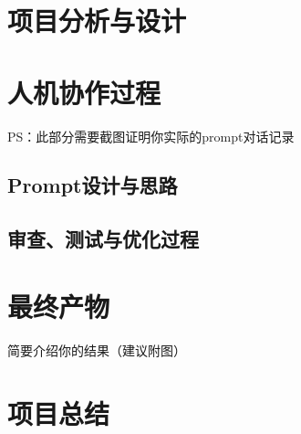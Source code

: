 \documentclass{sysucseexp}
\begin{document}

\makecover
\tableofcontents
\cleardoublepage
\pagestyle{main} %

\section{项目分析与设计}


\section{人机协作过程}
PS：此部分需要截图证明你实际的prompt对话记录
\subsection{Prompt设计与思路}
\subsection{审查、测试与优化过程}

\section{最终产物}
简要介绍你的结果（建议附图）

\section{项目总结}
\end{document}
